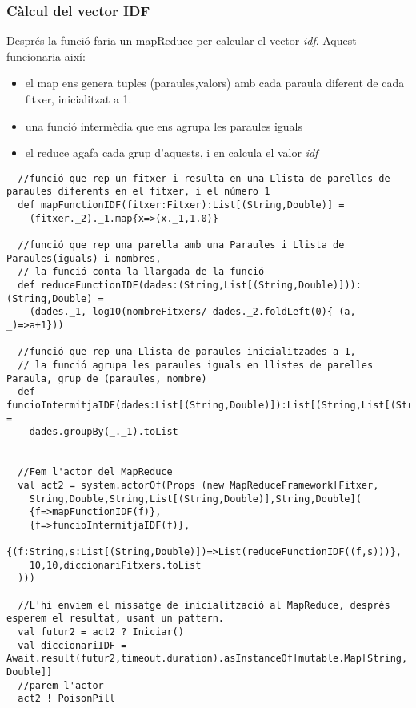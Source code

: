 \documentclass[11pt,a4paper,twoside]{report}
\begin{document}
\subsubsection{Càlcul del vector IDF}

Després la funció faria un mapReduce per calcular el vector \textit{idf}. Aquest funcionaria així:

\begin{itemize}
  \item el map ens genera tuples (paraules,valors) amb cada paraula diferent de cada fitxer, inicialitzat a 1.
  \item una funció intermèdia que ens agrupa les paraules iguals
  \item el reduce agafa cada grup d'aquests, i en calcula el valor \textit{idf}
\end{itemize}

\begin{lstlisting}
  //funció que rep un fitxer i resulta en una Llista de parelles de paraules diferents en el fitxer, i el número 1
  def mapFunctionIDF(fitxer:Fitxer):List[(String,Double)] =
    (fitxer._2)._1.map{x=>(x._1,1.0)}

  //funció que rep una parella amb una Paraules i Llista de Paraules(iguals) i nombres,
  // la funció conta la llargada de la funció
  def reduceFunctionIDF(dades:(String,List[(String,Double)])):(String,Double) =
    (dades._1, log10(nombreFitxers/ dades._2.foldLeft(0){ (a, _)=>a+1}))

  //funció que rep una Llista de paraules inicialitzades a 1,
  // la funció agrupa les paraules iguals en llistes de parelles Paraula, grup de (paraules, nombre)
  def funcioIntermitjaIDF(dades:List[(String,Double)]):List[(String,List[(String,Double)])] =
    dades.groupBy(_._1).toList


  //Fem l'actor del MapReduce
  val act2 = system.actorOf(Props (new MapReduceFramework[Fitxer,
    String,Double,String,List[(String,Double)],String,Double](
    {f=>mapFunctionIDF(f)},
    {f=>funcioIntermitjaIDF(f)},
    {(f:String,s:List[(String,Double)])=>List(reduceFunctionIDF((f,s)))},
    10,10,diccionariFitxers.toList
  )))

  //L'hi enviem el missatge de inicialització al MapReduce, després esperem el resultat, usant un pattern.
  val futur2 = act2 ? Iniciar()
  val diccionariIDF = Await.result(futur2,timeout.duration).asInstanceOf[mutable.Map[String, Double]]
  //parem l'actor
  act2 ! PoisonPill
\end{lstlisting}
\end{document}

